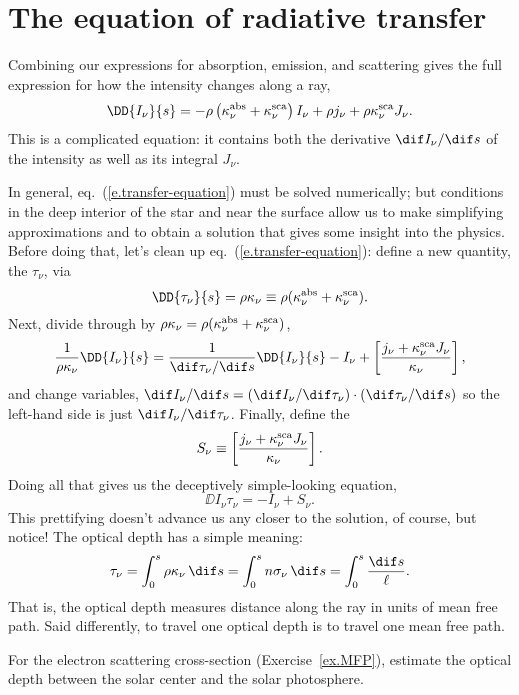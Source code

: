 \section{The equation of radiative transfer}
\label{s.equation-radiative-transfer}

Combining our expressions for absorption, emission, and scattering gives the full expression for how the intensity changes along a ray,
\begin{equation}\label{e.transfer-equation}
\DD{I_{\nu}}{s} = -\rho\left(\kapabs + \kapscat\right) I_{\nu} + \rho j_{\nu} + \rho\kapscat J_{\nu}.
\end{equation}
This is a complicated  equation: it contains both the derivative $\dif I_{\nu}/\dif s$ of the intensity as well as its integral $J_{\nu}$.

In general, eq.~(\ref{e.transfer-equation}) must be solved numerically; but conditions in the deep interior of the star and near the surface allow us to make simplifying approximations and to obtain a solution that gives some insight into the physics. Before doing that, let's clean up eq.~(\ref{e.transfer-equation}): define a new quantity, the  $\tau_{\nu}$, via
\[
	\DD{\tau_{\nu}}{s} = \rho\kappa_{\nu} \equiv \rho(\kapabs+\kapscat).
\]
Next, divide through by $\rho\kappa_{\nu}=\rho(\kappa_\nu^{\mathrm{abs}} + \kappa_\nu^{\mathrm{sca}})$,
\[
	\frac{1}{\rho\kappa_{\nu}}\DD{I_{\nu}}{s} = \frac{1}{\dif\tau_{\nu}/\dif s}\DD{I_{\nu}}{s} -I_{\nu} + \left[\frac{j_{\nu} + \kapscat J_{\nu}}{\kappa_{\nu}}\right],
\]
and change variables, $\dif I_{\nu}/\dif s = (\dif I_{\nu}/\dif\tau_{\nu})\cdot(\dif\tau_{\nu}/\dif s)$ so the left-hand side is just $\dif I_{\nu}/\dif \tau_{\nu}$. Finally, define the 
\[ S_{\nu} \equiv \left[\frac{j_{\nu} + \kappa_\nu^{\mathrm{sca}} J_{\nu}}{\kappa_{\nu}}\right].\]
Doing all that gives us the deceptively simple-looking equation,
\begin{equation}\label{e.simple-transfer}
	\DD{I_{\nu}}{\tau_{\nu}} = -I_{\nu} + S_{\nu}.
\end{equation}
This prettifying doesn't advance us any closer to the solution, of course, but notice! The optical depth has a simple meaning:
\[
	\tau_{\nu} = \int_{0}^{s} \rho\kappa_{\nu}\,\dif s = \int_{0}^{s} n\sigma_{\nu}\,\dif s = \int_{0}^{s} \frac{\dif s}{\ell}.
\]
That is, the optical depth measures distance along the ray in units of mean free path. Said differently, to travel one optical depth is to travel one mean free path.

\begin{exercisebox}
For the electron scattering cross-section (Exercise~\ref{ex.MFP}), estimate the optical depth between the solar center and the solar photosphere.
\end{exercisebox}

